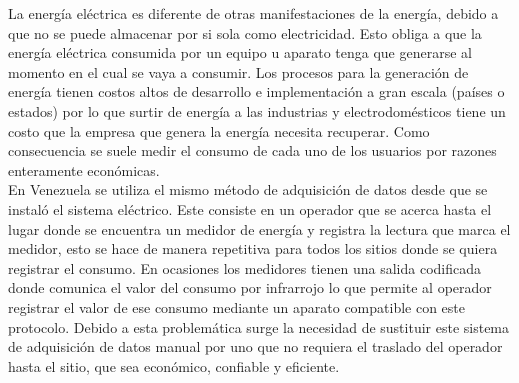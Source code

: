 \documentclass[12pt,letterpaper]{article}
\begin{document}
\vspace{0.3cm}

La energía eléctrica es diferente de otras manifestaciones de la energía, debido a que no se puede almacenar por si sola como electricidad. Esto obliga a que la energía eléctrica consumida por un equipo u aparato tenga que generarse al momento en el cual se vaya a consumir. Los procesos para la generación de energía tienen costos altos de desarrollo e implementación a gran escala (países o estados) por lo que surtir de energía a las industrias y electrodomésticos tiene un costo que la empresa que genera la energía necesita recuperar. Como consecuencia se suele medir el consumo de cada uno de los usuarios por razones enteramente económicas.\\


En Venezuela se utiliza el mismo método de adquisición de datos desde que se instaló el sistema eléctrico. Este consiste en un operador que se acerca hasta el lugar donde se encuentra un medidor de energía y registra la lectura que marca el medidor, esto se hace de manera repetitiva para todos los sitios donde se quiera registrar el consumo. En ocasiones los medidores tienen una salida codificada donde comunica el valor del consumo por infrarrojo lo que permite al operador registrar el valor de ese consumo mediante un aparato compatible con este protocolo. Debido a esta problemática surge la necesidad de sustituir este sistema de adquisición de datos manual por uno que no requiera el traslado del operador hasta el sitio, que sea económico, confiable y eficiente.\\


\end{document}
